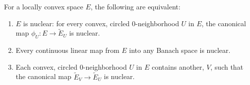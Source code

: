 For a locally convex space $E$, the following are equivalent:
\begin{enumerate}
\item[(a)] $E$ is nuclear: for every convex, circled $0$-neighborhood $U$ in $E$, the canonical map $\phi_U: E \to \tilde{E}_U$ is nuclear.
\item[(b)] Every continuous linear map from $E$ into any Banach space is nuclear.
\item[(c)] Each convex, circled $0$-neighborhood $U$ in $E$ contains another, $V$, such that the canonical map $\tilde{E}_V \to \tilde{E}_U$ is nuclear.
\end{enumerate}
